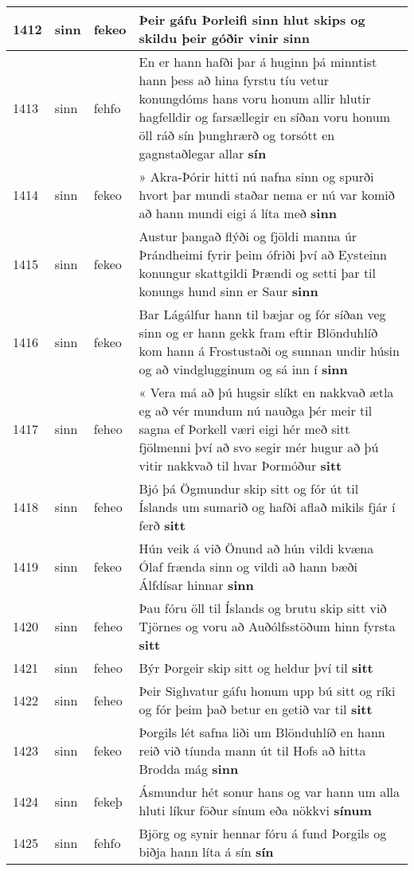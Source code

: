 \documentclass{article}
\begin{document}
\begin{longtable}{p{1cm}|p{1cm}|p{1cm}|p{13cm}}
\hline
1412&sinn&fekeo&Þeir gáfu Þorleifi sinn hlut skips og skildu þeir góðir vinir \textbf{sinn} \\
\hline
1413&sinn&fehfo&En er hann hafði þar á huginn þá minntist hann þess að hina fyrstu tíu vetur konungdóms hans voru honum allir hlutir hagfelldir og farsællegir en síðan voru honum öll ráð sín þunghrærð og torsótt en gagnstaðlegar allar \textbf{sín} \\
\hline
1414&sinn&fekeo&» Akra-Þórir hitti nú nafna sinn og spurði hvort þar mundi staðar nema er nú var komið að hann mundi eigi á líta með \textbf{sinn} \\
\hline
1415&sinn&fekeo&Austur þangað flýði og fjöldi manna úr Þrándheimi fyrir þeim ófriði því að Eysteinn konungur skattgildi Þrændi og setti þar til konungs hund sinn er Saur \textbf{sinn} \\
\hline
1416&sinn&fekeo&Bar Lágálfur hann til bæjar og fór síðan veg sinn og er hann gekk fram eftir Blönduhlíð kom hann á Frostustaði og sunnan undir húsin og að vindglugginum og sá inn í \textbf{sinn} \\
\hline
1417&sinn&feheo&« Vera má að þú hugsir slíkt en nakkvað ætla eg að vér mundum nú nauðga þér meir til sagna ef Þorkell væri eigi hér með sitt fjölmenni því að svo segir mér hugur að þú vitir nakkvað til hvar Þormóður \textbf{sitt} \\
\hline
1418&sinn&feheo&Bjó þá Ögmundur skip sitt og fór út til Íslands um sumarið og hafði aflað mikils fjár í ferð \textbf{sitt} \\
\hline
1419&sinn&fekeo&Hún veik á við Önund að hún vildi kvæna Ólaf frænda sinn og vildi að hann bæði Álfdísar hinnar \textbf{sinn} \\
\hline
1420&sinn&feheo&Þau fóru öll til Íslands og brutu skip sitt við Tjörnes og voru að Auðólfsstöðum hinn fyrsta \textbf{sitt} \\
\hline
1421&sinn&feheo&Býr Þorgeir skip sitt og heldur því til \textbf{sitt} \\
\hline
1422&sinn&feheo&Þeir Sighvatur gáfu honum upp bú sitt og ríki og fór þeim það betur en getið var til \textbf{sitt} \\
\hline
1423&sinn&fekeo&Þorgils lét safna liði um Blönduhlíð en hann reið við tíunda mann út til Hofs að hitta Brodda mág \textbf{sinn} \\
\hline
1424&sinn&fekeþ&Ásmundur hét sonur hans og var hann um alla hluti líkur föður sínum eða nökkvi \textbf{sínum} \\
\hline
1425&sinn&fehfo&Björg og synir hennar fóru á fund Þorgils og biðja hann líta á sín \textbf{sín} \\

\end{longtable}
\end{document}
